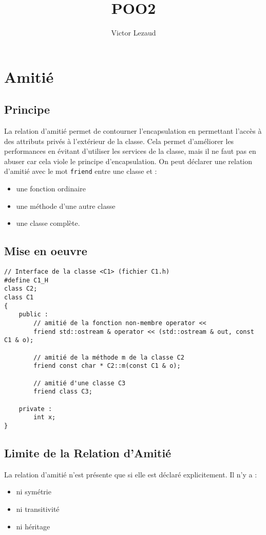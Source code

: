 \documentclass[10pt,a4paper,twoside]{article}
\author{Victor Lezaud}
\title{POO2}
\begin{document}
\maketitle
\renewcommand{\contentsname}{Sommaire}
\tableofcontents

\newpage
\section{Amitié}
\subsection{Principe}
La relation d'amitié permet de contourner l'encapsulation en permettant l'accès à des attributs privés à l'extérieur de la classe. Cela permet d'améliorer les performances en évitant d'utiliser les services de la classe, mais il ne faut pas en abuser car cela viole le principe d'encapsulation. On peut déclarer une relation d'amitié avec le mot \verb=friend= entre une classe et :
\begin{itemize}
\item une fonction ordinaire
\item une méthode d'une autre classe
\item une classe complète.
\end{itemize}

\subsection{Mise en oeuvre}
\begin{verbatim}
// Interface de la classe <C1> (fichier C1.h)
#define C1_H
class C2;
class C1
{
	public :
		// amitié de la fonction non-membre operator <<
		friend std::ostream & operator << (std::ostream & out, const C1 & o);
		
		// amitié de la méthode m de la classe C2
		friend const char * C2::m(const C1 & o);
		
		// amitié d'une classe C3
		friend class C3;
	
	private :
		int x;
}
\end{verbatim}

\subsection{Limite de la Relation d'Amitié}
La relation d'amitié n'est présente que si elle est déclaré explicitement. Il n'y a :
\begin{itemize}
\item ni symétrie
\item ni transitivité
\item ni héritage
\end{itemize}
\end{document}
